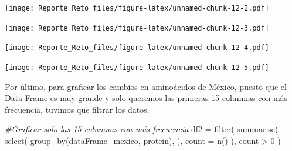 \documentclass[
  12pt,
]{article}
\newenvironment{Shaded}{\begin{snugshade}}{\end{snugshade}}
\newcommand{\AttributeTok}[1]{\textcolor[rgb]{0.77,0.63,0.00}{#1}}
\newcommand{\CommentTok}[1]{\textcolor[rgb]{0.56,0.35,0.01}{\textit{#1}}}
\newcommand{\DecValTok}[1]{\textcolor[rgb]{0.00,0.00,0.81}{#1}}
\newcommand{\FunctionTok}[1]{\textcolor[rgb]{0.00,0.00,0.00}{#1}}
\newcommand{\NormalTok}[1]{#1}
\newcommand{\OtherTok}[1]{\textcolor[rgb]{0.56,0.35,0.01}{#1}}
\newcommand{\SpecialCharTok}[1]{\textcolor[rgb]{0.00,0.00,0.00}{#1}}
\newcommand{\StringTok}[1]{\textcolor[rgb]{0.31,0.60,0.02}{#1}}
\begin{document}
\texttt{[image: Reporte\_Reto\_files/figure-latex/unnamed-chunk-12-2.pdf]}

\begin{Shaded}
\end{Shaded}

\texttt{[image: Reporte\_Reto\_files/figure-latex/unnamed-chunk-12-3.pdf]}

\begin{Shaded}
\end{Shaded}

\texttt{[image: Reporte\_Reto\_files/figure-latex/unnamed-chunk-12-4.pdf]}

\begin{Shaded}
\end{Shaded}

\texttt{[image: Reporte\_Reto\_files/figure-latex/unnamed-chunk-12-5.pdf]}

Por último, para graficar los cambios en aminoácidos de México, puesto
que el Data Frame es muy grande y solo queremos las primeras 15 columnas
con más frecuencia, tuvimos que filtrar los datos.

\begin{Shaded}
\begin{Highlighting}[]
\CommentTok{\#Graficar solo las 15 columnas con más frecuencia}
\NormalTok{df2 }\OtherTok{=} \FunctionTok{filter}\NormalTok{(}
  \FunctionTok{summarise}\NormalTok{(}
    \FunctionTok{select}\NormalTok{(}
      \FunctionTok{group\_by}\NormalTok{(dataFrame\_mexico, protein),}
\NormalTok{    ),}
    \AttributeTok{count =} \FunctionTok{n}\NormalTok{()}
\NormalTok{  ),}
\NormalTok{  count }\SpecialCharTok{\textgreater{}} \DecValTok{0}
\NormalTok{)}
\end{Highlighting}
\end{Shaded}
\end{document}
